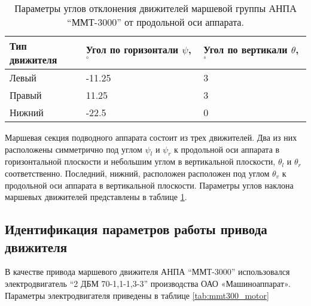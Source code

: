 \begin{table}
    \caption{Параметры углов отклонения движителей маршевой группы АНПА ``ММТ-3000'' от продольной оси аппарата.}
    \label{tab:mmt3000_propulsion_angles}
    \centering
    \begin{tabular}{lll}
        \toprule
        Тип движителя & Угол по горизонтали $\psi$, $^{\circ}$  & Угол по вертикали $\theta$, $^{\circ}$ \\
        \midrule
        Левый  & -11.25 & 3 \\
        Правый &  11.25 & 3 \\
        Нижний &  -22.5 & 0 \\
        \bottomrule
    \end{tabular}
\end{table}

Маршевая секция подводного аппарата состоит из трех движителей.
Два из них расположены симметрично под углом $\psi_l$ и $\psi_r$ к продольной оси аппарата в горизонтальной плоскости и небольшим углом в вертикальной плоскости, $\theta_l$ и $\theta_r$ соответственно.
Последний, нижний, расположен расположен под углом $\theta_v$ к продольной оси аппарата в вертикальной плоскости.
Параметры углов наклона маршевых движителей представлены в таблице \ref{tab:mmt3000_propulsion_angles}.

\subsection{Идентификация параметров работы привода движителя}
В качестве привода маршевого движителя АНПА ``ММТ-3000'' использовался электродвигатель ``2 ДБМ 70-1,1-1,3-3'' производства ОАО «Машиноаппарат».
Параметры электродвигателя приведены в таблице \ref{tab:mmt300_motor}

